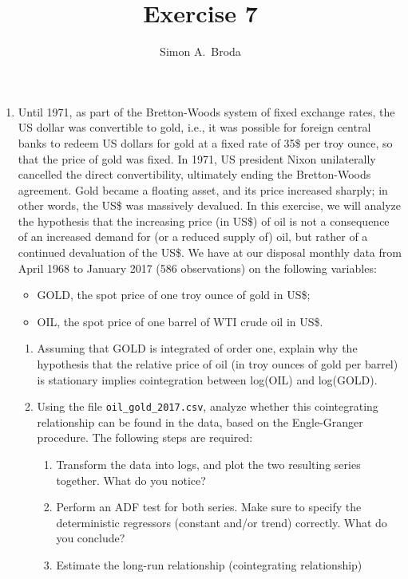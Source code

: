 \documentclass[11pt, a4paper]{article}
\begin{document}
\title{Exercise 7}
\author{Simon A.\ Broda}
\date{}
\maketitle

\begin{enumerate}

\item Until 1971, as part of the Bretton-Woods system of fixed exchange rates, the US dollar was convertible to gold, i.e., it was possible for foreign central banks to redeem US dollars for gold at a fixed rate of 35\$ per troy ounce, so that the price of gold was fixed. In 1971, US president Nixon unilaterally cancelled the direct convertibility, ultimately ending the Bretton-Woods agreement. Gold became a floating asset, and its price increased sharply; in other words, the US\$ was massively devalued. In this exercise, we will analyze the hypothesis that the increasing price (in US\$) of oil is not a consequence of an increased demand for (or a reduced supply of) oil, but rather of a continued devaluation of the US\$. We have at our disposal monthly data from April 1968 to January 2017 (586 observations) on the following variables:
\begin{itemize}
\item GOLD, the spot price of one troy ounce of gold in US\$;
\item OIL, the spot price of one barrel of WTI crude oil in US\$.
\end{itemize}
\begin{enumerate}
\item Assuming that GOLD is integrated of order one, explain why the hypothesis that the relative price of oil (in troy ounces of gold per barrel) is stationary implies cointegration between log(OIL) and log(GOLD).
\item Using the file \verb+oil_gold_2017.csv+, analyze whether this cointegrating relationship can be found in the data, based on the Engle-Granger procedure. The following steps are required:
\begin{enumerate}
	\item Transform the data into logs, and plot the two resulting series together. What do you notice?
	\item Perform an ADF test for both series. Make sure to specify the deterministic regressors (constant and/or trend) correctly. What do you conclude?
	\item  Estimate the long-run relationship (cointegrating relationship)

\end{enumerate}
\end{enumerate}
\end{enumerate}
\end{document}
